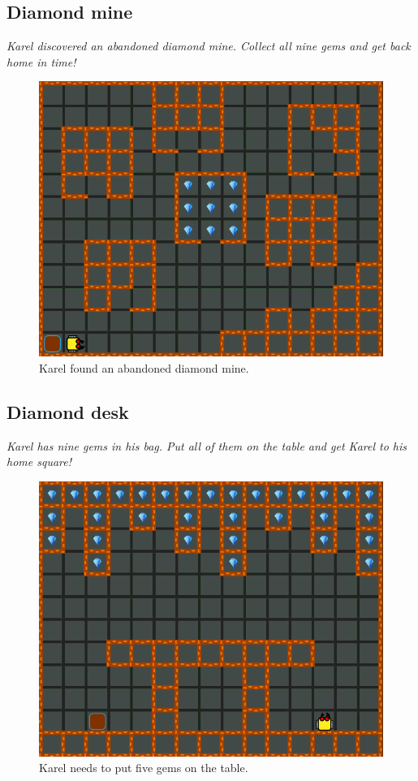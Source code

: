 \subsection{Diamond mine}

{\em Karel discovered an abandoned diamond mine. Collect all nine gems and get back home in time!}

\begin{figure}[!ht]
\begin{center}
\includegraphics[height=0.4\textwidth]{img/a11.png}
\end{center}
\vspace{-4mm}
\caption{Karel found an abandoned diamond mine.}
\label{fig:a11}
\vspace{-10mm}
\end{figure}
\newpage
\noindent

\subsection{Diamond desk}

{\em Karel has nine gems in his bag. Put all of them on the table and get Karel to his home square!}

\begin{figure}[!ht]
\begin{center}
\includegraphics[height=0.4\textwidth]{img/a13.png}
\end{center}
\vspace{-4mm}
\caption{Karel needs to put five gems on the table.}
\label{fig:a13}
\vspace{-4mm}
\end{figure}
\noindent
\newpage

